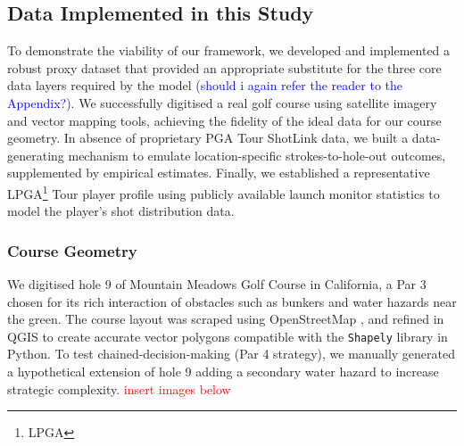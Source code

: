 \documentclass[11pt, letterpaper]{article}
\begin{document}
\subsection{Data Implemented in this Study}

To demonstrate the viability of our framework, we developed and implemented a robust proxy dataset that provided an appropriate substitute for the three core data layers required by the model \textcolor{blue}{(should i again refer the reader to the Appendix?)}. We successfully digitised a real golf course using satellite imagery and vector mapping tools, achieving the fidelity of the ideal data for our course geometry. In absence of proprietary PGA Tour ShotLink data, we built a data-generating mechanism to emulate location-specific strokes-to-hole-out outcomes, supplemented by empirical estimates. Finally, we established a representative LPGA\footnote{LPGA} Tour player profile using publicly available launch monitor statistics to model the player's shot distribution data.

\subsubsection{Course Geometry}
We digitised hole 9 of Mountain Meadows Golf Course in California, a Par 3 chosen for its rich interaction of obstacles such as bunkers and water hazards near the green. The course layout was scraped using OpenStreetMap \parencite{openstreetmap}, and refined in QGIS \parencite{qgis} to create accurate vector polygons compatible with the \texttt{Shapely} \parencite{shapely} library in Python. To test chained-decision-making (Par 4 strategy), we manually generated a hypothetical extension of hole 9 adding a secondary water hazard to increase strategic complexity. \textcolor{red}{insert images below}
\end{document}
